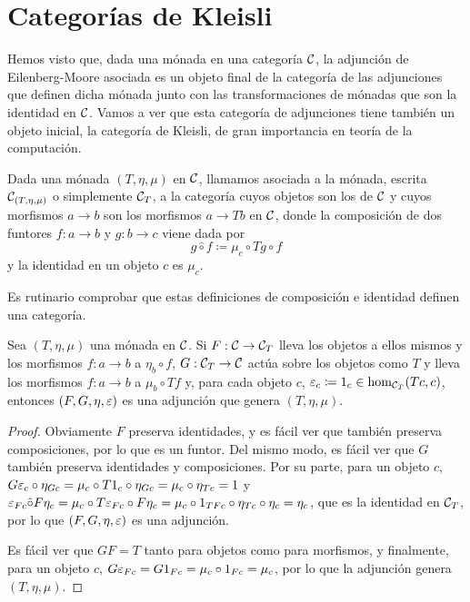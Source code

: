 \section{Categorías de Kleisli}

Hemos visto que, dada una mónada en una categoría $\mathcal{C}$, la adjunción de
Eilenberg-Moore asociada es un objeto final de la categoría de las adjunciones
que definen dicha mónada junto con las transformaciones de mónadas que son la
identidad en $\mathcal{C}$. Vamos a ver que esta categoría de adjunciones tiene también
un objeto inicial, la categoría de Kleisli, de gran importancia en teoría de la
computación.

\begin{definition}
  Dada una mónada $(T,\eta,\mu)$ en $\mathcal{C}$, llamamos 
  asociada a la mónada, escrita $\mathcal{C}_{(T,\eta,\mu)}$ o simplemente $\mathcal{C}_T$, a la
  categoría cuyos objetos son los de $\mathcal{C}$ y cuyos morfismos $a\to b$ son los
  morfismos $a\to Tb$ en $\mathcal{C}$, donde la composición de dos funtores $f:a\to b$
  y $g:b\to c$ viene dada por
  \[
    g\hat\circ f\coloneqq\mu_c\circ Tg\circ f
  \]
  y la identidad en un objeto $c$ es $\mu_c$.
\end{definition}


Es rutinario comprobar que estas definiciones de composición e identidad definen
una categoría.

\begin{theorem}
  Sea $(T,\eta,\mu)$ una mónada en $\mathcal{C}$. Si $F:\mathcal{C}\to\mathcal{C}_T$ lleva los objetos a
  ellos mismos y los morfismos $f:a\to b$ a $\eta_b\circ f$, $G:\mathcal{C}_T\to\mathcal{C}$
  actúa sobre los objetos como $T$ y lleva los morfismos $f:a\to b$ a
  $\mu_b\circ Tf$ y, para cada objeto $c$,
  $\varepsilon_c\coloneqq 1_c\in\hom_{\mathcal{C}_T}(Tc,c)$, entonces $(F,G,\eta,\varepsilon)$ es una
  adjunción que genera $(T,\eta,\mu)$.
\end{theorem}
\begin{proof}
  Obviamente $F$ preserva identidades, y es fácil ver que también preserva
  composiciones, por lo que es un funtor. Del mismo modo, es fácil ver que $G$
  también preserva identidades y composiciones. Por su parte, para un objeto
  $c$,
  $G\varepsilon_c\circ\eta_{Gc}=\mu_c\circ T1_c\circ\eta_{Gc}=\mu_c\circ\eta_{Tc}=1$ y
  $\varepsilon_{Fc}\hat\circ F\eta_c=\mu_c\circ T\varepsilon_{Fc}\circ F\eta_c=\mu_c\circ
  1_{TFc}\circ \eta_{Tc}\circ\eta_c=\eta_c$, que es la identidad en $\mathcal{C}_T$, por
  lo que $(F,G,\eta,\varepsilon)$ es una adjunción.

  Es fácil ver que $GF=T$ tanto para objetos como para morfismos, y finalmente,
  para un objeto $c$, $G\varepsilon_{Fc}=G1_{Fc}=\mu_c\circ 1_{Fc}=\mu_c$, por lo que
  la adjunción genera $(T,\eta,\mu)$.
\end{proof}

